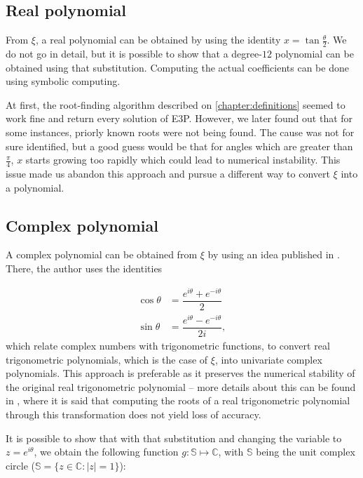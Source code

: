 \subsection{Real polynomial}

From $\xi$, a real polynomial can be obtained by using the identity $x = \tan{\frac{\theta}{2}}$. We do not go in detail, but it is possible to show that a degree-$12$ polynomial can be obtained using that substitution.
Computing the actual coefficients can be done using symbolic computing. 


At first,  the root-finding algorithm described on \autoref{chapter:definitions} seemed to work fine and return every solution of E3P. However, we later found out that for some instances, priorly known roots were not being found. The cause was not for sure identified, but a good guess would be that for angles which are greater than $\frac{\pi}{4}$, $x$ starts growing too rapidly which could lead to numerical instability. This issue made us abandon this approach and pursue a different way to convert $\xi$ into a polynomial.

\subsection{Complex polynomial}

A complex polynomial can be obtained from $\xi$ by using an idea published in . There, the author uses the identities

\begin{align}\label{eq:complex_trig_cos}
	\cos{\theta} &= \dfrac{e^{i\theta} + e^{-i\theta}}{2}\\
	\label{eq:complex_trig_sin}
	\sin{\theta} &= \dfrac{e^{i\theta} - e^{-i\theta}}{2i},
\end{align}
which relate complex numbers with trigonometric functions, to convert real trigonometric polynomials, which is the case of $\xi$, into univariate complex polynomials.
This approach is preferable as it preserves the numerical stability of the original real trigonometric polynomial -- more details about this can be found in , where it is said that computing the roots of a real trigonometric polynomial through this transformation does not yield loss of accuracy.

It is possible to show that with that substitution and changing the variable to $z=e^{i\theta}$, we obtain the following function $g : \mathbb{S} \mapsto \mathbb{C}$, with $\mathbb{S}$ being the unit complex circle ($\mathbb{S} = \{z \in \mathbb{C} : |z|=1\}$):

